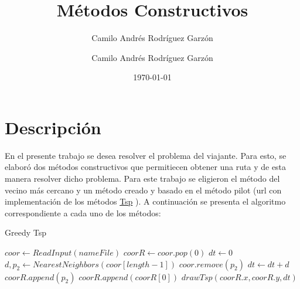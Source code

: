 \documentclass{article}
\title{Métodos Constructivos}
\author{Camilo Andrés Rodríguez Garzón}
\author{Camilo Andrés Rodríguez Garzón}
\date{\today}
\begin{document}
\maketitle

\section{Descripción}
En el presente trabajo se desea resolver el problema del viajante. Para esto, se elaboró dos métodos constructivos que permitiecen obtener una ruta y de esta manera resolver dicho problema. Para este trabajo se eligieron el método del vecino más cercano y un método creado y basado en el método pilot (url con implementación de los métodos \href{https://github.com/camilorodriguezga/Tsp}{Tsp}
). A continuación se presenta el algoritmo correspondiente a cada uno de los métodos:

\begin{algorithm}[H]
	\caption{Greedy Tsp}\label{GreedyTsp}
	\begin{algorithmic}[1]
		\State $coor \gets ReadInput(nameFile)$ 
		\State $coorR \gets coor.pop(0)$ 
		\State $dt \gets 0$ 
		\State $d, p_2 \gets NearestNeighbors(coor[length - 1])$ 
		\State $coor.remove(p_2)$ 
		\State $dt \gets dt + d$
		\State $coorR.append(p_2)$
		\EndWhile\label{euclidendwhile}
		\State $coorR.append(coorR[0])$ 
		\State $drawTsp(coorR.x, coorR.y, dt)$
		\EndProcedure
	\end{algorithmic}
\end{algorithm}
\end{document}

